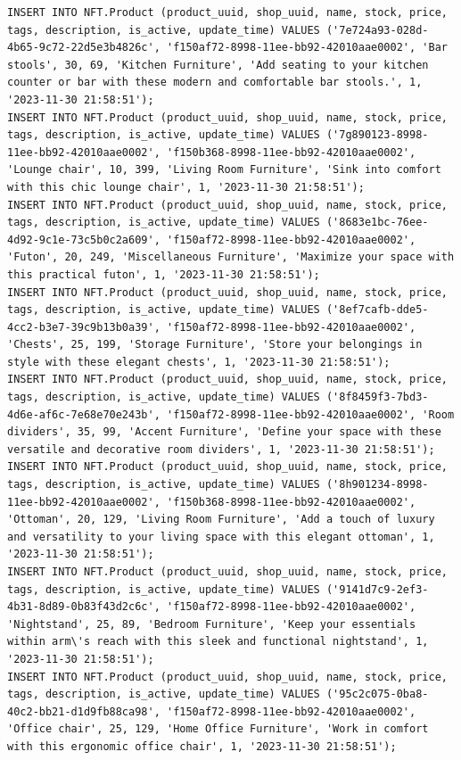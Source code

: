 \documentclass[a4paper, 12pt]{article}
\begin{document}
\begin{lstlisting}
INSERT INTO NFT.Product (product_uuid, shop_uuid, name, stock, price, tags, description, is_active, update_time) VALUES ('7e724a93-028d-4b65-9c72-22d5e3b4826c', 'f150af72-8998-11ee-bb92-42010aae0002', 'Bar stools', 30, 69, 'Kitchen Furniture', 'Add seating to your kitchen counter or bar with these modern and comfortable bar stools.', 1, '2023-11-30 21:58:51');
INSERT INTO NFT.Product (product_uuid, shop_uuid, name, stock, price, tags, description, is_active, update_time) VALUES ('7g890123-8998-11ee-bb92-42010aae0002', 'f150b368-8998-11ee-bb92-42010aae0002', 'Lounge chair', 10, 399, 'Living Room Furniture', 'Sink into comfort with this chic lounge chair', 1, '2023-11-30 21:58:51');
INSERT INTO NFT.Product (product_uuid, shop_uuid, name, stock, price, tags, description, is_active, update_time) VALUES ('8683e1bc-76ee-4d92-9c1e-73c5b0c2a609', 'f150af72-8998-11ee-bb92-42010aae0002', 'Futon', 20, 249, 'Miscellaneous Furniture', 'Maximize your space with this practical futon', 1, '2023-11-30 21:58:51');
INSERT INTO NFT.Product (product_uuid, shop_uuid, name, stock, price, tags, description, is_active, update_time) VALUES ('8ef7cafb-dde5-4cc2-b3e7-39c9b13b0a39', 'f150af72-8998-11ee-bb92-42010aae0002', 'Chests', 25, 199, 'Storage Furniture', 'Store your belongings in style with these elegant chests', 1, '2023-11-30 21:58:51');
INSERT INTO NFT.Product (product_uuid, shop_uuid, name, stock, price, tags, description, is_active, update_time) VALUES ('8f8459f3-7bd3-4d6e-af6c-7e68e70e243b', 'f150af72-8998-11ee-bb92-42010aae0002', 'Room dividers', 35, 99, 'Accent Furniture', 'Define your space with these versatile and decorative room dividers', 1, '2023-11-30 21:58:51');
INSERT INTO NFT.Product (product_uuid, shop_uuid, name, stock, price, tags, description, is_active, update_time) VALUES ('8h901234-8998-11ee-bb92-42010aae0002', 'f150b368-8998-11ee-bb92-42010aae0002', 'Ottoman', 20, 129, 'Living Room Furniture', 'Add a touch of luxury and versatility to your living space with this elegant ottoman', 1, '2023-11-30 21:58:51');
INSERT INTO NFT.Product (product_uuid, shop_uuid, name, stock, price, tags, description, is_active, update_time) VALUES ('9141d7c9-2ef3-4b31-8d89-0b83f43d2c6c', 'f150af72-8998-11ee-bb92-42010aae0002', 'Nightstand', 25, 89, 'Bedroom Furniture', 'Keep your essentials within arm\'s reach with this sleek and functional nightstand', 1, '2023-11-30 21:58:51');
INSERT INTO NFT.Product (product_uuid, shop_uuid, name, stock, price, tags, description, is_active, update_time) VALUES ('95c2c075-0ba8-40c2-bb21-d1d9fb88ca98', 'f150af72-8998-11ee-bb92-42010aae0002', 'Office chair', 25, 129, 'Home Office Furniture', 'Work in comfort with this ergonomic office chair', 1, '2023-11-30 21:58:51');

\end{lstlisting}
\end{document}
